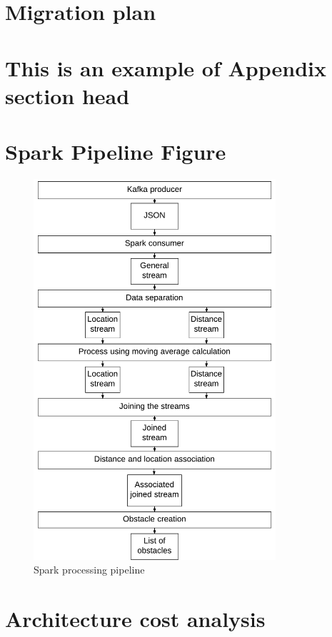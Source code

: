 \documentclass[prodmode,acmtosem]{acmsmall} %
\begin{document}

\begin{acks}
\end{acks}  





\elecappendix

\medskip

\section{Migration plan}
\label{app:MigrationPlan}
\section{This is an example of Appendix section head}

\pagebreak
\section{Spark Pipeline Figure}
\label{app:SparkPipeline}
\begin{figure}[!ht]
\label{fig:SparkPipeline}
\centering
\includegraphics[width=0.8\textwidth]{SparkPipeline.pdf}
\caption{Spark processing pipeline}
\end{figure}
\clearpage
\pagebreak
\section{Architecture cost analysis}
\label{ArchitectureCost}
\end{document}

